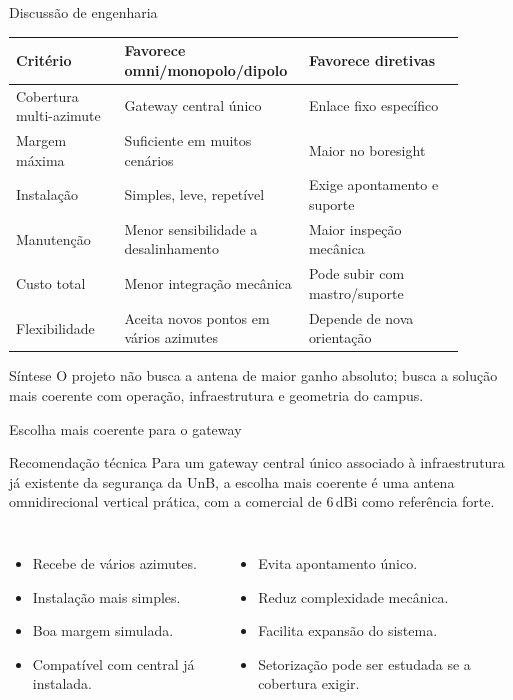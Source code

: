 \documentclass[aspectratio=169]{beamer}
\newcommand{\SI}[2]{#1\,#2}
\begin{document}
\begin{frame}{Discussão de engenharia}
\small
\begin{table}
\centering
\scriptsize
\begin{tabular}{p{0.23\linewidth}p{0.33\linewidth}p{0.33\linewidth}}
\toprule
Critério & Favorece omni/monopolo/dipolo & Favorece diretivas \\
\midrule
Cobertura multi-azimute & Gateway central único & Enlace fixo específico \\
Margem máxima & Suficiente em muitos cenários & Maior no boresight \\
Instalação & Simples, leve, repetível & Exige apontamento e suporte \\
Manutenção & Menor sensibilidade a desalinhamento & Maior inspeção mecânica \\
Custo total & Menor integração mecânica & Pode subir com mastro/suporte \\
Flexibilidade & Aceita novos pontos em vários azimutes & Depende de nova orientação \\
\bottomrule
\end{tabular}
\end{table}
\begin{block}{Síntese}
O projeto não busca a antena de maior ganho absoluto; busca a solução mais coerente com operação, infraestrutura e geometria do campus.
\end{block}
\end{frame}

\begin{frame}{Escolha mais coerente para o gateway}
\small
\begin{block}{Recomendação técnica}
Para um gateway central único associado à infraestrutura já existente da segurança da UnB, a escolha mais coerente é uma antena omnidirecional vertical prática, com a comercial de \SI{6}{dBi} como referência forte.
\end{block}
\begin{columns}[T,onlytextwidth]
\begin{itemize}
  \item Recebe de vários azimutes.
  \item Instalação mais simples.
  \item Boa margem simulada.
  \item Compatível com central já instalada.
\end{itemize}
\begin{itemize}
  \item Evita apontamento único.
  \item Reduz complexidade mecânica.
  \item Facilita expansão do sistema.
  \item Setorização pode ser estudada se a cobertura exigir.
\end{itemize}
\end{columns}
\end{frame}
\end{document}
